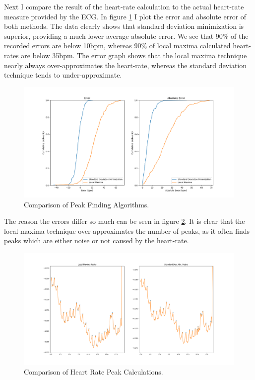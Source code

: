 \documentclass[12pt,a4paper,twoside,openright]{report}
\begin{document}
Next I compare the result of the heart-rate calculation to the actual
heart-rate measure provided by the ECG.
In figure \ref{fig:hrc-error} I plot the error and absolute error of both
methods. The data clearly shows that standard deviation minimization is
superior, providing a much lower average absolute error. We see that 90\% of
the recorded errors are below 10bpm, whereas 90\% of local maxima calculated
heart-rates are below 35bpm. The error graph shows that the local maxima
technique nearly always over-approximates the heart-rate, whereas the standard
deviation technique tends to under-approximate.

\begin{figure}[H]
	\centerline{\includegraphics[width=1\textwidth]{figs/peakfind.png}}
	\caption{Comparison of Peak Finding Algorithms.}
	\label{fig:hrc-error}
\end{figure}

The reason the errors differ so much can be seen in figure
\ref{fig:hr-peak-comparison}. It is clear that the local maxima technique
over-approximates the number of peaks, as it often finds peaks which are
either noise or not caused by the heart-rate.

\begin{figure}[H]
	\centering
	\includegraphics[width=1\textwidth]{figs/peak-comparison.png}
	\caption{Comparison of Heart Rate Peak Calculations.}
	\label{fig:hr-peak-comparison}
\end{figure}
\end{document}
